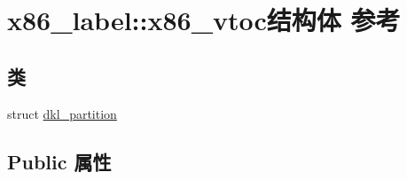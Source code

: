 \hypertarget{structx86__label_1_1x86__vtoc}{}\section{x86\+\_\+label\+:\+:x86\+\_\+vtoc结构体 参考}
\label{structx86__label_1_1x86__vtoc}
\subsection*{类}
\begin{DoxyCompactItemize}
\item 
struct \hyperlink{structx86__label_1_1x86__vtoc_1_1dkl__partition}{dkl\+\_\+partition}
\end{DoxyCompactItemize}
\subsection*{Public 属性}
